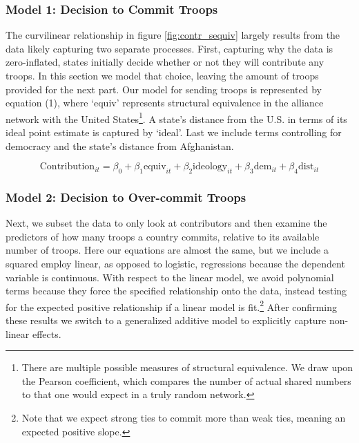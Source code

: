\documentclass[12pt,letterpaper]{article}
\begin{document}
		\subsubsection{Model 1: Decision to Commit Troops}
			The curvilinear relationship in figure \ref{fig:contr_sequiv} largely results from the data likely capturing two separate processes. First, capturing why the data is zero-inflated, states initially decide whether or not they will contribute any troops. In this section we model that choice, leaving the amount of troops provided for the next part. Our model for sending troops is represented by equation (1), where `equiv' represents structural equivalence in the alliance network with the United States\footnote{There are multiple possible measures of structural equivalence. We draw upon the Pearson coefficient, which compares the number of actual shared numbers to that one would expect in a truly random network.}. A state's distance from the U.S. in terms of its ideal point estimate is captured by `ideal'. \citep{bailey_twodimensionalanalysisseventy_2018} Last we include terms controlling for democracy and the state's distance from Afghanistan.

			\vspace{-2em}
			\begin{equation}
			\text{Contribution}_{it} = \beta_0 + \beta_1\text{equiv}_{it} +  \beta_2\text{ideology}_{it} + \beta_3\text{dem}_{it} + \beta_4\text{dist}_{it}
			\end{equation}
	
		\subsubsection{Model 2: Decision to Over-commit Troops}
			Next, we subset the data to only look at contributors and then examine the predictors of how many troops a country commits, relative to its available number of troops. Here our equations are almost the same, but we include a squared employ linear, as opposed to logistic, regressions because the dependent variable is continuous. With respect to the linear model, we avoid polynomial terms because they force the specified relationship onto the data, instead testing for the expected positive relationship if a linear model is fit.\footnote{Note that we expect strong ties to commit more than weak ties, meaning an expected positive slope.} After confirming these results we switch to a generalized additive model to explicitly capture non-linear effects.
\end{document}
